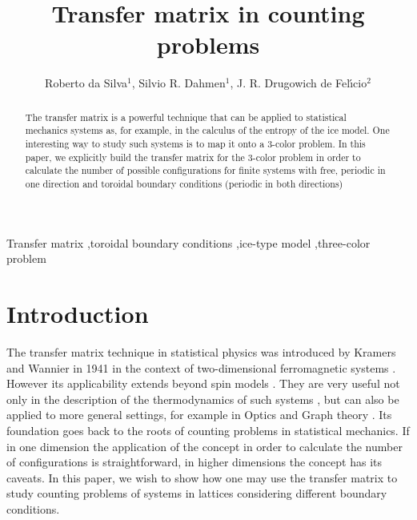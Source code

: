 \documentclass[3p, 10pt, onecolumn]{elsarticle}
\begin{document}

\begin{frontmatter}

\title{Transfer matrix in counting problems}

\author{Roberto da Silva$^{1}$, Silvio R. Dahmen$^{1}$, J. R. Drugowich de
Fel\'{\i}cio$^{2}$} 


\address{1 - Instituto de F\'{i}sica, Universidade Federal do Rio Grande do Sul, Porto Alegre, Rio Grande do Sul, Brazil\\ 
	2 - Departamento de F\'{i}sica, Faculdade de Filosofia, Ci\^{e}ncias e Letras de Riber\~{a}o Preto, Universidade de S\~{a}o Paulo, Ribeir\~{a}o Preto, S\~{a}o Paulo, Brazil}



\begin{abstract}

The transfer matrix is a powerful technique that can be applied to
statistical mechanics systems as, for example, in the calculus of the entropy
of the ice model. One interesting way to study such systems is to map it
onto a 3-color problem. In this paper, we explicitly build the transfer
matrix for the 3-color problem in order to calculate the number of possible
configurations for finite systems with free, periodic in one direction and
toroidal boundary conditions (periodic in both directions) 


\end{abstract}


\begin{keyword}
 Transfer matrix \sep toroidal boundary conditions \sep ice-type model \sep three-color problem
\end{keyword}


\end{frontmatter}



\section{Introduction}

The transfer matrix technique in statistical physics was introduced by
Kramers and Wannier in 1941 in the context of two-dimensional ferromagnetic
systems \cite{Krammers-I,Krammers-II}. However its applicability extends
beyond spin models \cite{Dimarzio,Lieb-I,Lieb-II,Baxter,Pegg,Teif}. They are
very useful not only in the description of the thermodynamics of such
systems \cite{Nightingale,Batchelor}, but can also be applied to more
general settings, for example in Optics \cite{Katsidis2002} and Graph theory 
\cite{Engstrom2002}. Its foundation goes back to the roots of counting
problems in statistical mechanics. If in one dimension the application of
the concept in order to calculate the number of configurations is
straightforward, in higher dimensions the concept has its caveats. In this
paper, we wish to show how one may use the transfer matrix to study counting
problems of systems in lattices considering different boundary conditions.
\end{document}
